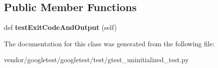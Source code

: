 \subsection*{Public Member Functions}
\begin{DoxyCompactItemize}
\item 
\mbox{\label{classgtest__uninitialized__test_1_1_g_test_uninitialized_test_ace4bbad0abec476b03a91bb453e6451c}} 
def {\bfseries test\+Exit\+Code\+And\+Output} (self)
\end{DoxyCompactItemize}


The documentation for this class was generated from the following file\+:\begin{DoxyCompactItemize}
\item 
vendor/googletest/googletest/test/gtest\+\_\+uninitialized\+\_\+test.\+py\end{DoxyCompactItemize}
